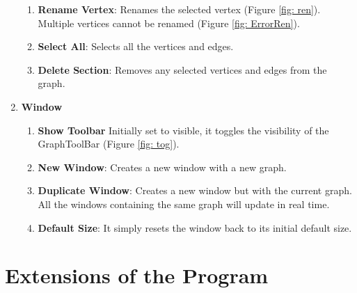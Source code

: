 \documentclass[a4paper]{article}
\begin{document}
\begin{enumerate}
\begin{enumerate}[label*=\arabic*.]
            \item \textbf{Rename Vertex}: Renames the selected vertex (Figure \ref{fig: ren}). Multiple vertices cannot be renamed (Figure \ref{fig: ErrorRen}).
            \item \textbf{Select All}: Selects all the vertices and edges.
            \item \textbf{Delete Section}: Removes any selected vertices and edges from the graph.
        \end{enumerate}
    \item \textbf{Window}
        \begin{enumerate}[label*=\arabic*.]
            \item \textbf{Show Toolbar} Initially set to visible, it toggles the visibility of the GraphToolBar  (Figure \ref{fig: tog}).
            \item \textbf{New Window}: Creates a new window with a new graph.
            \item \textbf{Duplicate Window}: Creates a new window but with the current graph. All the windows containing the same graph will update in real time.
            \item \textbf{Default Size}: It simply resets the window back to its initial default size.
        \end{enumerate}
\end{enumerate}



\section{Extensions of the Program} \label{section: extension}
\end{document}
